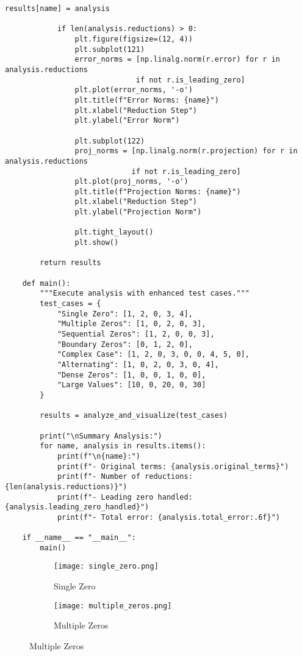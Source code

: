\begin{lstlisting}[caption={Enhanced Continued Fraction Analysis Framework},label={lst:analysis-code}]
            results[name] = analysis
            
            if len(analysis.reductions) > 0:
                plt.figure(figsize=(12, 4))
                plt.subplot(121)
                error_norms = [np.linalg.norm(r.error) for r in analysis.reductions 
                              if not r.is_leading_zero]
                plt.plot(error_norms, '-o')
                plt.title(f"Error Norms: {name}")
                plt.xlabel("Reduction Step")
                plt.ylabel("Error Norm")
                
                plt.subplot(122)
                proj_norms = [np.linalg.norm(r.projection) for r in analysis.reductions 
                             if not r.is_leading_zero]
                plt.plot(proj_norms, '-o')
                plt.title(f"Projection Norms: {name}")
                plt.xlabel("Reduction Step")
                plt.ylabel("Projection Norm")
                
                plt.tight_layout()
                plt.show()
            
        return results
    
    def main():
        """Execute analysis with enhanced test cases."""
        test_cases = {
            "Single Zero": [1, 2, 0, 3, 4],
            "Multiple Zeros": [1, 0, 2, 0, 3],
            "Sequential Zeros": [1, 2, 0, 0, 3],
            "Boundary Zeros": [0, 1, 2, 0],
            "Complex Case": [1, 2, 0, 3, 0, 0, 4, 5, 0],
            "Alternating": [1, 0, 2, 0, 3, 0, 4],
            "Dense Zeros": [1, 0, 0, 1, 0, 0],
            "Large Values": [10, 0, 20, 0, 30]
        }
        
        results = analyze_and_visualize(test_cases)
        
        print("\nSummary Analysis:")
        for name, analysis in results.items():
            print(f"\n{name}:")
            print(f"- Original terms: {analysis.original_terms}")
            print(f"- Number of reductions: {len(analysis.reductions)}")
            print(f"- Leading zero handled: {analysis.leading_zero_handled}")
            print(f"- Total error: {analysis.total_error:.6f}")
    
    if __name__ == "__main__":
        main()
\end{lstlisting}

\begin{figure}[htbp]
    \centering
    \begin{subfigure}[b]{0.45\textwidth}
        \centering
        \texttt{[image: single\_zero.png]}
        \caption{Single Zero}
        \label{fig:single_zero}
    \end{subfigure}
    \hfill
    \begin{subfigure}[b]{0.45\textwidth}
        \centering
        \texttt{[image: multiple\_zeros.png]}
        \caption{Multiple Zeros}
        \label{fig:multiple_zeros}
    \end{subfigure}
\end{figure}


